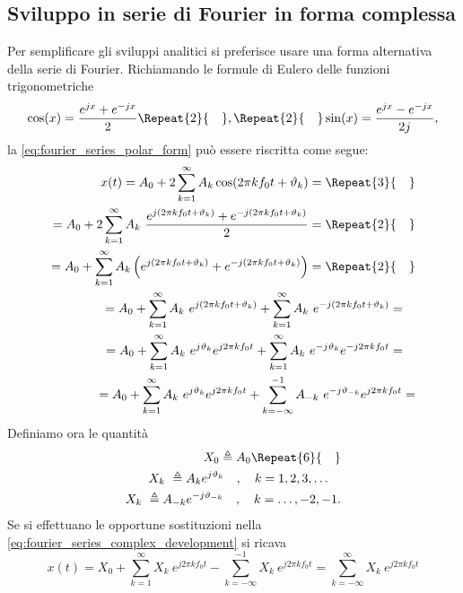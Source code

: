 \documentclass[12pt,oneside,openany]{memoir}
\numberwithin{equation}{subsection}
\newcommand{\quads}[1]{\Repeat{#1}{\quad}}
\begin{document}
\subsection{Sviluppo in serie di Fourier in forma complessa}
Per semplificare gli sviluppi analitici si preferisce usare una forma alternativa della serie di Fourier. Richiamando le formule di Eulero delle funzioni trigonometriche
\begin{equation}
	\cos(x) = \frac{e^{jx} + e^{-jx}}{2} \quads{2} , \quads{2} \sin(x) = \frac{e^{jx} - e^{-jx}}{2j},
\end{equation}
la \eqref{eq:fourier_series_polar_form} pu\`o essere riscritta come segue:
\begin{equation}\label{eq:fourier_series_complex_development}
\begin{split}
	x(t) = A_0 + 2 \sum_{k = 1}^{\infty} A_k \cos(2 \pi k f_0 t + \vartheta_k) =
	\quads{3}
	\\
	= A_0 + 2 \sum_{k = 1}^{\infty} A_k \ \frac{e^{j(2 \pi k f_0 t + \vartheta_k)} + e^{-j(2 \pi k f_0 t + \vartheta_k)}}{2} =
	\quads{2}
	\\
	= A_0 + \sum_{k = 1}^{\infty} A_k \left( e^{j(2 \pi k f_0 t + \vartheta_k)} + e^{-j(2 \pi k f_0 t + \vartheta_k)} \right) =
	\quads{2}
	\\
	= A_0 + \sum_{k = 1}^{\infty} A_k \ e^{j(2 \pi k f_0 t + \vartheta_k)} + \sum_{k = 1}^{\infty} A_k \ e^{-j(2 \pi k f_0 t + \vartheta_k)} =
	\quad
	\\
	= A_0 + \sum_{k = 1}^{\infty} A_k \ e^{j\vartheta_k}e^{j 2 \pi k f_0 t} + \sum_{k = 1}^{\infty} A_k \ e^{-j\vartheta_k}e^{-j 2 \pi k f_0 t} =
	\quad
	\\
	= A_0 + \sum_{k = 1}^{\infty} A_k \ e^{j\vartheta_k}e^{j 2 \pi k f_0 t} + \sum_{k = -\infty}^{-1} A_{-k} \ e^{-j\vartheta_{-k}}e^{j 2 \pi k f_0 t} =
\end{split}
\end{equation}
Definiamo ora le quantit\`a
\begin{equation}
\begin{split}
	X_0 \triangleq A_0
	\quads{6}
	\\
	X_k \ \triangleq A_k e^{j \vartheta_k} \quad , \quad k = 1, 2, 3, \dots
	\quad
	\\
	X_k \ \triangleq A_{-k} e^{-j \vartheta_{-k}} \quad , \quad k = \dots , -2, -1.
\end{split}
\end{equation}
Se si effettuano le opportune sostituzioni nella \eqref{eq:fourier_series_complex_development} si ricava
\begin{equation}\label{eq:fourier_series_complex_form}
	x(t) = X_0 + \sum_{k = 1}^{\infty} X_k \ e^{j 2 \pi k f_0 t} - \sum_{k = -\infty}^{-1} X_k \ e^{j 2 \pi k f_0 t} = \sum_{k = -\infty}^{\infty} X_k \ e^{j 2 \pi k f_0 t}
\end{equation}
\end{document}
